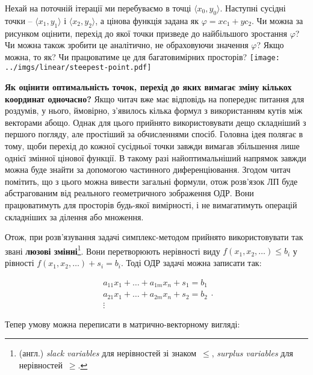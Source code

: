 \documentclass[\main/book.tex]{subfiles}
\begin{document}
\begin{question}
 Нехай на поточній ітерації ми перебуваємо в точці $\langle x_0, y_0 \rangle$. Наступні сусідні точки -- $\langle x_1, y_1 \rangle$ і $\langle x_2, y_2 \rangle$, а цінова функція задана як $\varphi = x c_1 + y c_2$. Чи можна за рисунком оцінити, перехід до якої точки призведе до найбільшого зростання $\varphi$? Чи можна також зробити це аналітично, не обраховуючи значення $\varphi$? Якщо можна, то як? Чи працюватиме це для багатовимірних просторів?
 \center
 \texttt{[image: ../imgs/linear/steepest-point.pdf]}
\end{question}

\textbf{Як оцінити оптимальність точок, перехід до яких вимагає зміну кількох координат одночасно?} \quad Якщо читач вже має відповідь на попереднє питання для роздумів, у нього, ймовірно, з'явилось кілька формул з використанням кутів між векторами абощо. Однак для цього прийнято використовувати дещо складніший з першого погляду, але простіший за обчисленнями спосіб. Головна ідея полягає в тому, щоби перехід до кожної сусідньої точки завжди вимагав збільшення лише однієї змінної цінової функції. В такому разі найоптимальніший напрямок завжди можна буде знайти за допомогою частинного диференціювання. Згодом читач помітить, що з цього можна вивести загальні формули, отож розв'язок ЛП буде абстрагованим від реального геометричного зображення ОДР. Вони працюватимуть для просторів будь-якої вимірності, і не вимагатимуть операцій складніших за ділення або множення.
\noclub

Отож, при розв'язування задачі симплекс-методом прийнято використовувати так звані \textbf{люзові змінні}\footnote{(англ.) \textit{slack variables} для нерівностей зі знаком~\flqq{}$\leq$\frqq{}, \textit{surplus variables} для нерівностей~\flqq{}$\geq$\frqq{}.}. Вони перетворюють нерівності виду ${f(x_1, x_2, \ldots) \leq b_i}$ у рівності ${ f(x_1, x_2, \ldots) + s_i = b_i }$. Тоді ОДР задачі можна записати так:

\[
 \begin{array}{l}
  a_{11} x_1 + \ldots + a_{1m} x_n + s_1 = b_1 \\
  a_{21} x_1 + \ldots + a_{2m} x_n + s_2 = b_2 \\
  \vdots
 \end{array}.
\]

Тепер умову можна переписати в матрично-векторному вигляді:
\end{document}
